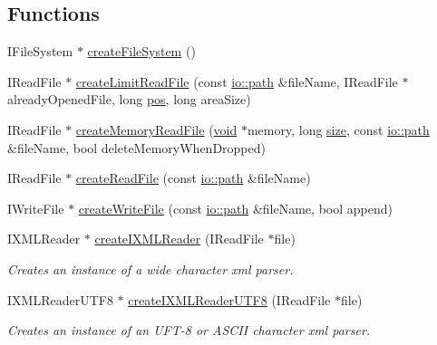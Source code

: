 \subsection*{Functions}
\begin{DoxyCompactItemize}
\item 
I\-File\-System $\ast$ \hyperlink{namespaceirr_1_1io_ae28f767d65b959919a72abee490dba94}{create\-File\-System} ()
\item 
I\-Read\-File $\ast$ \hyperlink{namespaceirr_1_1io_aaffde8ef59ed98d4606a342caddca8e1}{create\-Limit\-Read\-File} (const \hyperlink{glext_8h_a23ffbd2c127adf1c57bc2667fdedb1c9}{io\-::path} \&file\-Name, I\-Read\-File $\ast$already\-Opened\-File, long \hyperlink{dmfsupport_8h_aaa93777baf1c20a5face0f3880aae8cf}{pos}, long area\-Size)
\item 
I\-Read\-File $\ast$ \hyperlink{namespaceirr_1_1io_ab30f7cd10d675fa7da0a936a7bd67d4a}{create\-Memory\-Read\-File} (\hyperlink{wglext_8h_a9e6b7f1933461ef318bb000d6bd13b83}{void} $\ast$memory, long \hyperlink{glext_8h_a3d1e3edfcf61ca2d831883e1afbad89e}{size}, const \hyperlink{glext_8h_a23ffbd2c127adf1c57bc2667fdedb1c9}{io\-::path} \&file\-Name, bool delete\-Memory\-When\-Dropped)
\item 
I\-Read\-File $\ast$ \hyperlink{namespaceirr_1_1io_a16ff593e91ead74120ac459c4fe97bcf}{create\-Read\-File} (const \hyperlink{glext_8h_a23ffbd2c127adf1c57bc2667fdedb1c9}{io\-::path} \&file\-Name)
\item 
I\-Write\-File $\ast$ \hyperlink{namespaceirr_1_1io_a5dec825b7f68ec19b252c9502ef501ec}{create\-Write\-File} (const \hyperlink{glext_8h_a23ffbd2c127adf1c57bc2667fdedb1c9}{io\-::path} \&file\-Name, bool append)
\item 
I\-X\-M\-L\-Reader $\ast$ \hyperlink{namespaceirr_1_1io_a05e953b48e06562abb13265347a808af}{create\-I\-X\-M\-L\-Reader} (I\-Read\-File $\ast$file)
\begin{DoxyCompactList}\small\item\em Creates an instance of a wide character xml parser. \end{DoxyCompactList}\item 
I\-X\-M\-L\-Reader\-U\-T\-F8 $\ast$ \hyperlink{namespaceirr_1_1io_a574af901470894ef0cda49c99c0d574e}{create\-I\-X\-M\-L\-Reader\-U\-T\-F8} (I\-Read\-File $\ast$file)
\begin{DoxyCompactList}\small\item\em Creates an instance of an U\-F\-T-\/8 or A\-S\-C\-I\-I character xml parser. \end{DoxyCompactList}\item 

\end{DoxyCompactItemize}
